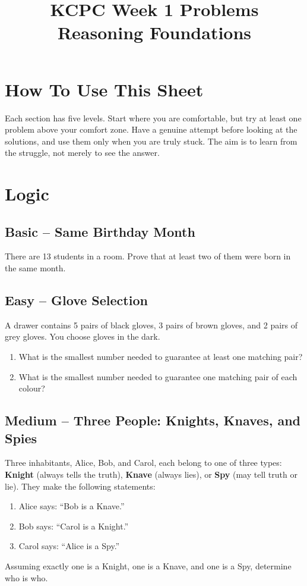 \documentclass[12pt]{article}
\title{KCPC Week 1 Problems\\Reasoning Foundations}
\author{}
\date{}
\begin{document}
\maketitle
\thispagestyle{fancy}

\section*{How To Use This Sheet}
Each section has five levels. Start where you are comfortable, but
try at least one problem above your comfort zone. Have a genuine
attempt before looking at the solutions, and use them only when you
are truly stuck. The aim is to learn from the struggle, not merely to
see the answer.

\section{Logic}

\subsection*{Basic -- Same Birthday Month}
There are 13 students in a room. Prove that at least two of them were
born in the same month.

\subsection*{Easy -- Glove Selection}
A drawer contains 5 pairs of black gloves, 3 pairs of brown gloves,
and 2 pairs of grey gloves. You choose gloves in the dark.
\begin{enumerate}[label=(\alph*)]
    \item What is the smallest number needed to guarantee at least one
        matching pair?
    \item What is the smallest number needed to guarantee one matching
        pair of each colour?
\end{enumerate}

\subsection*{Medium -- Three People: Knights, Knaves, and Spies}
Three inhabitants, Alice, Bob, and Carol, each belong to one of
three types: \textbf{Knight} (always tells the truth), \textbf{Knave}
(always lies), or \textbf{Spy} (may tell truth or lie). They make
the following statements:
\begin{enumerate}[label=(\alph*)]
    \item Alice says: ``Bob is a Knave.''
    \item Bob says: ``Carol is a Knight.''
    \item Carol says: ``Alice is a Spy.''
\end{enumerate}
Assuming exactly one is a Knight, one is a Knave, and one is a Spy,
determine who is who.
\end{document}
